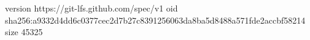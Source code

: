 version https://git-lfs.github.com/spec/v1
oid sha256:a9332d4dd6c0377cec2d7b27c8391256063da8ba5d8488a571fde2accbf58214
size 45325
